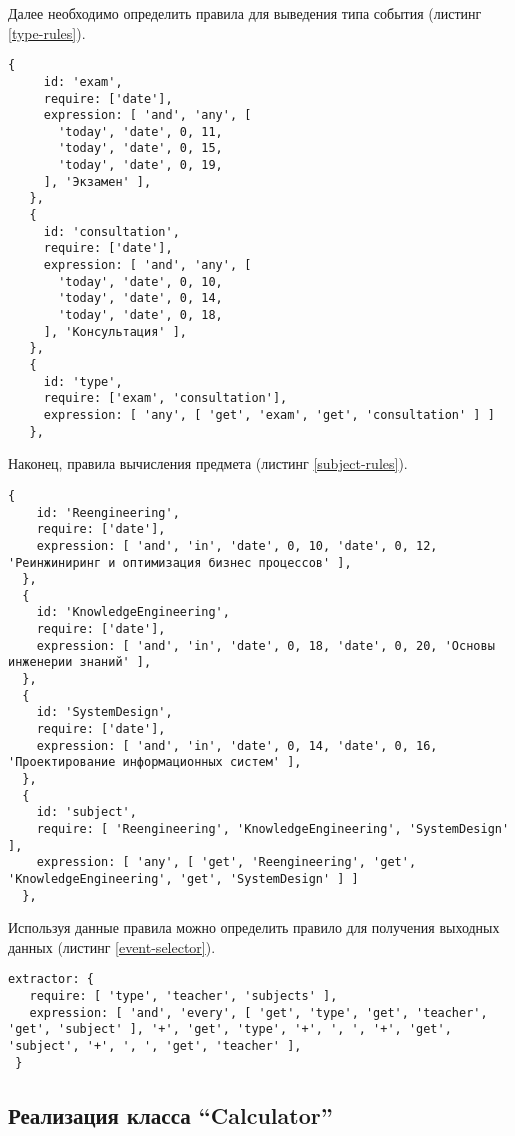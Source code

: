 Далее необходимо определить правила для выведения типа события (листинг \ref{type-rules}).

\begin{lstlisting}[caption={Правила для вычисления типа события},label={type-rules}]
  {
     id: 'exam',
     require: ['date'],
     expression: [ 'and', 'any', [
       'today', 'date', 0, 11,
       'today', 'date', 0, 15,
       'today', 'date', 0, 19,
     ], 'Экзамен' ],
   },
   {
     id: 'consultation',
     require: ['date'],
     expression: [ 'and', 'any', [
       'today', 'date', 0, 10,
       'today', 'date', 0, 14,
       'today', 'date', 0, 18,
     ], 'Консультация' ],
   },
   {
     id: 'type',
     require: ['exam', 'consultation'],
     expression: [ 'any', [ 'get', 'exam', 'get', 'consultation' ] ]
   },
\end{lstlisting}

Наконец, правила вычисления предмета (листинг \ref{subject-rules}).

\begin{lstlisting}[caption={Правила для вычисления предмета},label={subject-rules}]
  {
    id: 'Reengineering',
    require: ['date'],
    expression: [ 'and', 'in', 'date', 0, 10, 'date', 0, 12, 'Реинжиниринг и оптимизация бизнес процессов' ],
  },
  {
    id: 'KnowledgeEngineering',
    require: ['date'],
    expression: [ 'and', 'in', 'date', 0, 18, 'date', 0, 20, 'Основы инженерии знаний' ],
  },
  {
    id: 'SystemDesign',
    require: ['date'],
    expression: [ 'and', 'in', 'date', 0, 14, 'date', 0, 16, 'Проектирование информационных систем' ],
  },
  {
    id: 'subject',
    require: [ 'Reengineering', 'KnowledgeEngineering', 'SystemDesign' ],
    expression: [ 'any', [ 'get', 'Reengineering', 'get', 'KnowledgeEngineering', 'get', 'SystemDesign' ] ]
  },
\end{lstlisting}

Используя данные правила можно определить правило для получения выходных данных (листинг \ref{event-selector}).

\begin{lstlisting}[caption={Правило слияния параметров события},label={event-selector}]
  extractor: {
   require: [ 'type', 'teacher', 'subjects' ],
   expression: [ 'and', 'every', [ 'get', 'type', 'get', 'teacher', 'get', 'subject' ], '+', 'get', 'type', '+', ', ', '+', 'get', 'subject', '+', ', ', 'get', 'teacher' ],
 }
\end{lstlisting}

\subsection{Реализация класса “Calculator”}

